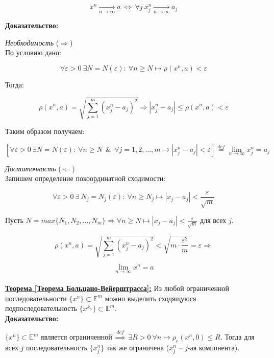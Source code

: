 \documentclass[a4paper,12pt]{article} %
\begin{document}
	\[ x^n \xrightarrow[n \to \infty]{} a ~ \Leftrightarrow ~ \forall j ~ x_j^n \xrightarrow[n \to \infty]{} a_j \]
	
	\textbf{Доказательство:} 
	
	\textit{Необходимость} ($\Rightarrow$)\\
	
	По условию дано:
	
	\[ \forall \varepsilon > 0 ~ \exists N = N(\varepsilon) : ~ \forall n \geqslant N \mapsto \rho(x^n, a) < \varepsilon \]
	
	Тогда:
	
	\[ \rho(x^n, a) = \sqrt{\sum\limits_{j = 1}^m (x_j^n - a_j)^2} \Rightarrow |x_j^n - a_j| \leqslant \rho(x^n, a) < \varepsilon \]
	
	Таким образом получаем:
	
	\[ [\forall \varepsilon > 0 ~ \exists N = N(\varepsilon) : ~ \forall n \geqslant N ~~ \& ~~ \forall j = 1, 2, \dots, m \mapsto |x_j^n - a_j| < \varepsilon] \stackrel{def}{=} \lim\limits_{n \to \infty} x_j^n = a_j \]
	
	\textit{Достаточность} ($\Leftarrow$)\\
	
	Запишем определение покоординатной сходимости:
	
	\[ \forall \varepsilon > 0 ~ \exists ~ N_j = N_j(\varepsilon) : ~ \forall n \geqslant N_j \mapsto |x_j - a_j| < \frac{\varepsilon}{\sqrt{m}} \]
	
	Пусть $N = max\{N_1, N_2, \dots, N_m \} \Rightarrow \forall n \geqslant N \mapsto |x_j - a_j| < \frac{\varepsilon}{\sqrt{m}}$ для всех $j$.
	
	\[ \rho(x^n, a) = \sqrt{\sum\limits_{j = 1}^m (x_j^n - a_j)^2} < \sqrt{m \cdot \frac{\varepsilon^2}{m}} = \varepsilon \Rightarrow \]
	
	\[ \lim\limits_{n \to \infty} x^n = a \]\\
	
	\underline{\textbf{Теорема [Теорема Больцано-Вейерштрасса]:}} Из любой ограниченной последовательности $\{x^n \} \subset \mathbb{E}^m$ можно выделить сходящуюся подпоследовательность $\{x^{k_n} \} \subset \mathbb{E}^m$.\\
	
	\textbf{Доказательство:}
	
	$\{x^n \} \subset \mathbb{E}^m$ является ограниченной $\stackrel{def}{\Rightarrow}$ $\exists R > 0 ~ \forall n \mapsto \rho_e(x^n, 0) \leqslant R$. Тогда для всех $j$ последовательность $\{x_j^n \}$ так же ограничена ($x_j^n$ -- $j$-ая компонента).\\
	
\end{document}
